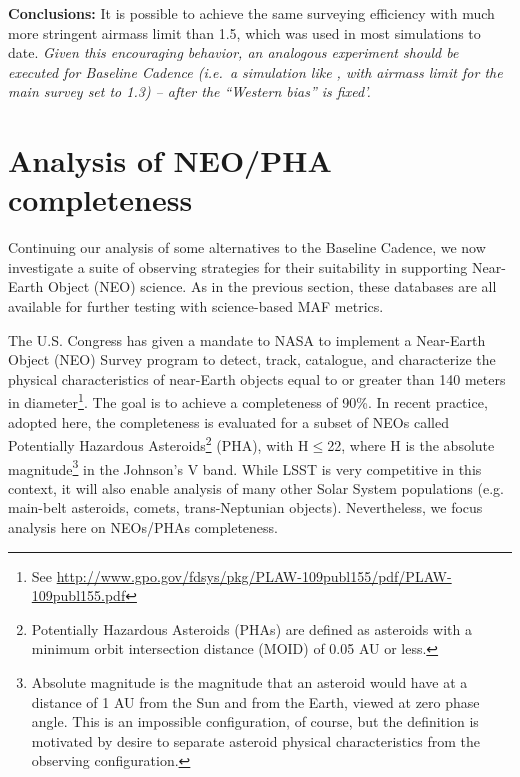 {\bf Conclusions:}  It is possible to achieve the same surveying
efficiency with much more stringent airmass limit than 1.5, which was
used in most simulations to date.  {\it Given this encouraging
behavior, an analogous experiment should be executed for Baseline
Cadence (i.e.\ a simulation like , with airmass
limit for the main survey set to 1.3) -- after the ``Western bias'' is
fixed'.}

\navigationbar


\section{Analysis of NEO/PHA completeness}
\def\secname{cadexp:NEOs}\label{sec:\secname}


Continuing our analysis of some alternatives to the Baseline Cadence,
we now investigate a suite of observing strategies for their
suitability in supporting Near-Earth Object (NEO) science. As in the
previous section, these \OpSim databases are all available for further
testing with science-based MAF metrics.

The U.S. Congress has given a mandate to NASA to implement a
Near-Earth Object (NEO) Survey program to detect, track, catalogue,
and characterize the physical characteristics of near-Earth objects
equal to or greater than 140 meters in diameter\footnote{See
\url{http://www.gpo.gov/fdsys/pkg/PLAW-109publ155/pdf/PLAW-109publ155.pdf}}.
The goal is to achieve a completeness of 90\%. In recent practice,
adopted here, the completeness is evaluated for a subset of NEOs
called Potentially Hazardous Asteroids\footnote{ Potentially Hazardous
Asteroids (PHAs) are defined as asteroids with a minimum orbit
intersection distance (MOID) of 0.05 AU or less.}  (PHA), with
H$\le$22, where H is the absolute magnitude\footnote{Absolute
magnitude is the magnitude that an asteroid would have at a distance
of 1 AU from the Sun and from the Earth, viewed at zero phase angle.
This is an impossible configuration, of course, but the definition is
motivated by desire to separate asteroid physical characteristics from
the observing configuration.} in the Johnson's V band. While LSST is
very competitive in this context, it will also enable analysis of many
other Solar System populations (e.g. main-belt asteroids, comets,
trans-Neptunian objects). Nevertheless, we focus analysis here on
NEOs/PHAs completeness.


